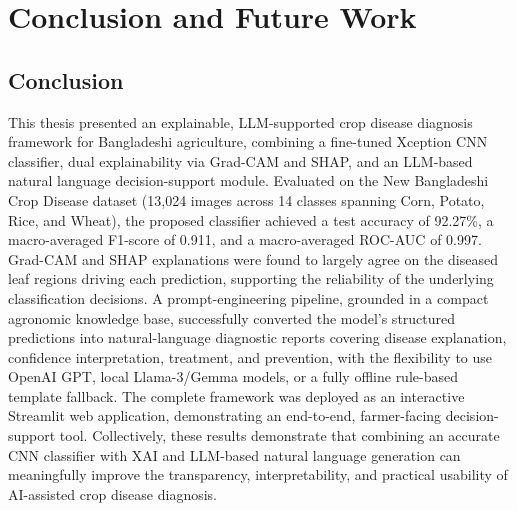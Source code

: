 \documentclass[12pt,a4paper,oneside]{report}
\begin{document}
\chapter{Conclusion and Future Work}
\label{ch:conclusion}

\section{Conclusion}
This thesis presented an explainable, LLM-supported crop disease diagnosis framework for Bangladeshi agriculture,
combining a fine-tuned Xception CNN classifier, dual explainability via Grad-CAM and SHAP, and an LLM-based
natural language decision-support module. Evaluated on the New Bangladeshi Crop Disease dataset (13,024 images
across 14 classes spanning Corn, Potato, Rice, and Wheat), the proposed classifier achieved a test accuracy of
92.27\%, a macro-averaged F1-score of 0.911, and a macro-averaged ROC-AUC of 0.997. Grad-CAM and SHAP explanations
were found to largely agree on the diseased leaf regions driving each prediction, supporting the reliability of
the underlying classification decisions. A prompt-engineering pipeline, grounded in a compact agronomic knowledge
base, successfully converted the model's structured predictions into natural-language diagnostic reports covering
disease explanation, confidence interpretation, treatment, and prevention, with the flexibility to use OpenAI
GPT, local Llama-3/Gemma models, or a fully offline rule-based template fallback. The complete framework was
deployed as an interactive Streamlit web application, demonstrating an end-to-end, farmer-facing decision-support
tool. Collectively, these results demonstrate that combining an accurate CNN classifier with XAI and LLM-based
natural language generation can meaningfully improve the transparency, interpretability, and practical usability
of AI-assisted crop disease diagnosis.
\end{document}
